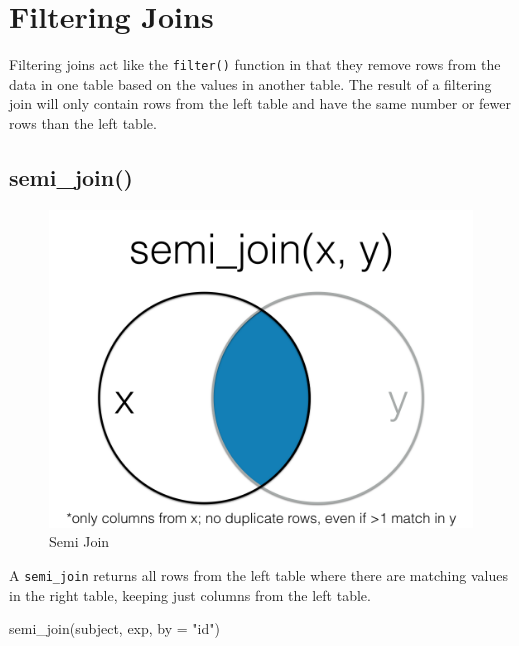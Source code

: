 \documentclass[
  oneside]{book}
\newenvironment{Shaded}{\begin{snugshade}}{\end{snugshade}}
\newcommand{\AttributeTok}[1]{\textcolor[rgb]{0.77,0.63,0.00}{#1}}
\newcommand{\FunctionTok}[1]{\textcolor[rgb]{0.00,0.00,0.00}{#1}}
\newcommand{\NormalTok}[1]{#1}
\newcommand{\StringTok}[1]{\textcolor[rgb]{0.31,0.60,0.02}{#1}}
\begin{document}
\hypertarget{filtering-joins}{%
\section{Filtering Joins}\label{filtering-joins}}

Filtering joins act like the \texttt{filter()} function in that they remove rows from the data in one table based on the values in another table. The result of a filtering join will only contain rows from the left table and have the same number or fewer rows than the left table.

\hypertarget{semi_join}{%
\subsection{semi\_join()}\label{semi_join}}

\begin{figure}

{\centering \includegraphics[width=1\linewidth]{images/joins/semi_join} 

}

\caption{Semi Join}\label{fig:img-semi-join}
\end{figure}

A \texttt{semi\_join} returns all rows from the left table where there are matching values in the right table, keeping just columns from the left table.

\begin{Shaded}
\begin{Highlighting}[]
\FunctionTok{semi\_join}\NormalTok{(subject, exp, }\AttributeTok{by =} \StringTok{"id"}\NormalTok{)}
\end{Highlighting}
\end{Shaded}
\end{document}
